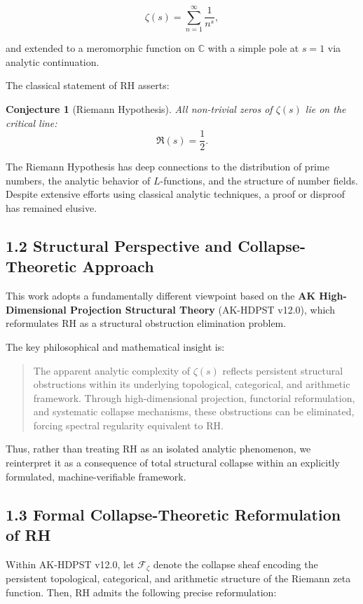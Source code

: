 \documentclass[11pt]{article}
\newtheorem{conjecture}{Conjecture}[section]
\begin{document}
\[
\zeta(s) = \sum_{n=1}^{\infty} \frac{1}{n^s},
\]

and extended to a meromorphic function on $\mathbb{C}$ with a simple pole at $s = 1$ via analytic continuation.

The classical statement of RH asserts:

\begin{conjecture}[Riemann Hypothesis]
All non-trivial zeros of $\zeta(s)$ lie on the critical line:
\[
\Re(s) = \frac{1}{2}.
\]
\end{conjecture}

The Riemann Hypothesis has deep connections to the distribution of prime numbers, the analytic behavior of $L$-functions, and the structure of number fields. Despite extensive efforts using classical analytic techniques, a proof or disproof has remained elusive.

\subsection*{1.2 Structural Perspective and Collapse-Theoretic Approach}

This work adopts a fundamentally different viewpoint based on the \textbf{AK High-Dimensional Projection Structural Theory} (AK-HDPST v12.0), which reformulates RH as a structural obstruction elimination problem.

The key philosophical and mathematical insight is:

\begin{quote}
The apparent analytic complexity of $\zeta(s)$ reflects persistent structural obstructions within its underlying topological, categorical, and arithmetic framework. Through high-dimensional projection, functorial reformulation, and systematic collapse mechanisms, these obstructions can be eliminated, forcing spectral regularity equivalent to RH.
\end{quote}

Thus, rather than treating RH as an isolated analytic phenomenon, we reinterpret it as a consequence of total structural collapse within an explicitly formulated, machine-verifiable framework.

\subsection*{1.3 Formal Collapse-Theoretic Reformulation of RH}

Within AK-HDPST v12.0, let $\mathcal{F}_{\zeta}$ denote the collapse sheaf encoding the persistent topological, categorical, and arithmetic structure of the Riemann zeta function. Then, RH admits the following precise reformulation:
\end{document}
